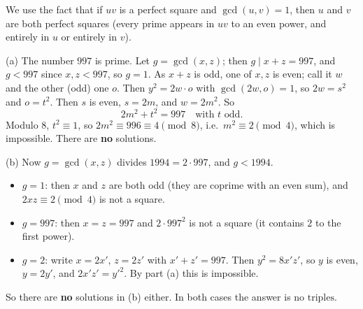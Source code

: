 We use the fact that if $uv$ is a perfect square and $\gcd(u,v)=1$, then $u$ and $v$ are both perfect squares (every prime appears in $uv$ to an even power, and entirely in $u$ or entirely in $v$).

(a) The number $997$ is prime. Let $g=\gcd(x,z)$; then $g\mid x+z=997$, and $g<997$ since $x,z<997$, so $g=1$. As $x+z$ is odd, one of $x,z$ is even; call it $w$ and the other (odd) one $o$. Then $y^2=2w\cdot o$ with $\gcd(2w,o)=1$, so $2w=s^2$ and $o=t^2$. Then $s$ is even, $s=2m$, and $w=2m^2$. So
\[
2m^2+t^2=997\quad\text{with } t \text{ odd}.
\]
Modulo $8$, $t^2\equiv1$, so $2m^2\equiv996\equiv4\pmod8$, i.e.\ $m^2\equiv2\pmod4$, which is impossible. There are \textbf{no} solutions.

(b) Now $g=\gcd(x,z)$ divides $1994=2\cdot997$, and $g<1994$.
\begin{itemize}
\item $g=1$: then $x$ and $z$ are both odd (they are coprime with an even sum), and $2xz\equiv2\pmod4$ is not a square.
\item $g=997$: then $x=z=997$ and $2\cdot997^2$ is not a square (it contains $2$ to the first power).
\item $g=2$: write $x=2x'$, $z=2z'$ with $x'+z'=997$. Then $y^2=8x'z'$, so $y$ is even, $y=2y'$, and $2x'z'=y'^2$. By part (a) this is impossible.
\end{itemize}
So there are \textbf{no} solutions in (b) either. In both cases the answer is $\boxed{\text{no triples}}$.
